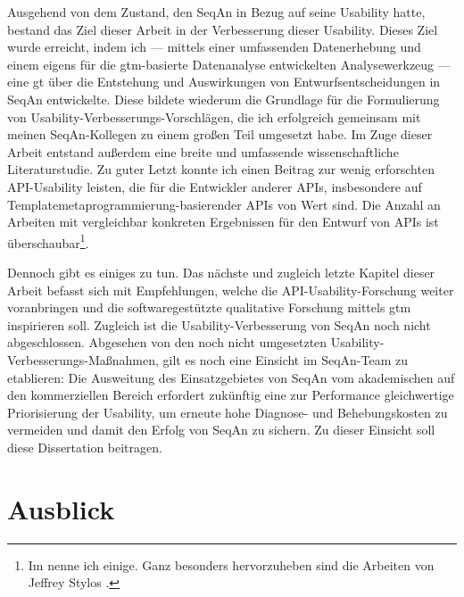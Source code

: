 Ausgehend von dem Zustand, den SeqAn in Bezug auf seine Usability hatte, bestand das Ziel dieser Arbeit in der Verbesserung dieser Usability. Dieses Ziel wurde erreicht, indem ich --- mittels einer umfassenden Datenerhebung und einem eigens für die \gls{gtm}-basierte Datenanalyse entwickelten Analysewerkzeug --- eine \gls{gt} über die Entstehung und Auswirkungen von Entwurfsentscheidungen in SeqAn entwickelte. Diese bildete wiederum die Grundlage für die Formulierung von Usability-Verbesserungs-Vorschlägen, die ich erfolgreich gemeinsam mit meinen SeqAn-Kollegen zu einem großen Teil umgesetzt habe. Im Zuge dieser Arbeit entstand außerdem eine breite und umfassende wissenschaftliche Literaturstudie. Zu guter Letzt konnte ich einen Beitrag zur wenig erforschten API-Usability leisten, die für die Entwickler anderer APIs, insbesondere auf Templatemetaprogrammierung-basierender APIs von Wert sind. Die Anzahl an Arbeiten mit vergleichbar konkreten Ergebnissen für den Entwurf von APIs ist überschaubar\footnote{Im  nenne ich einige. Ganz besonders hervorzuheben sind die Arbeiten von Jeffrey Stylos \citep{Stylos:2008jt,Stylos:2007jb,Ellis:2007kv,Stylos:2009ts}.}.

Dennoch gibt es einiges zu tun. Das nächste und zugleich letzte Kapitel dieser Arbeit befasst sich mit Empfehlungen, welche die API-Usability-Forschung weiter voranbringen und die softwaregestützte qualitative Forschung mittels \gls{gtm} inspirieren soll. Zugleich ist die Usability-Verbesserung von SeqAn noch nicht abgeschlossen. Abgesehen von den noch nicht umgesetzten Usability-Verbesserungs-Maßnahmen, gilt es noch eine Einsicht im SeqAn-Team zu etablieren: Die Ausweitung des Einsatzgebietes von SeqAn vom akademischen auf den kommerziellen Bereich erfordert zukünftig eine zur Performance gleichwertige Priorisierung der Usability, um erneute hohe Diagnose- und Behebungskosten zu vermeiden und damit den Erfolg von SeqAn zu sichern. Zu dieser Einsicht soll diese Dissertation beitragen. 
 










\chapter{Ausblick}
\label{sec:ausblick}

